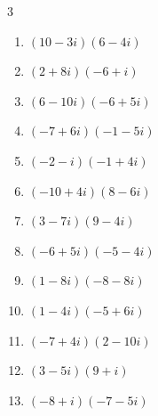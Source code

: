 \begin{multicols}{3}
\begin{enumerate}
        \phantom{$\displaystyle =-2+6i$}

  \item $\displaystyle (10-3i)(6-4i)$

        \phantom{$\displaystyle =48-58i$}

  \item $\displaystyle (2+8i)(-6+i)$

        \phantom{$\displaystyle =-20-46i$}

  \item $\displaystyle (6-10i)(-6+5i)$

        \phantom{$\displaystyle =14+90i$}

  \item $\displaystyle (-7+6i)(-1-5i)$

        \phantom{$\displaystyle =37+29i$}

  \item $\displaystyle (-2-i)(-1+4i)$

        \phantom{$\displaystyle =6-7i$}

  \item $\displaystyle (-10+4i)(8-6i)$

        \phantom{$\displaystyle =-56+92i$}

  \item $\displaystyle (3-7i)(9-4i)$

        \phantom{$\displaystyle =-1-75i$}

  \item $\displaystyle (-6+5i)(-5-4i)$

        \phantom{$\displaystyle =50-i$}

  \item $\displaystyle (1-8i)(-8-8i)$

        \phantom{$\displaystyle =-72+56i$}

  \item $\displaystyle (1-4i)(-5+6i)$

        \phantom{$\displaystyle =19+26i$}

  \item $\displaystyle (-7+4i)(2-10i)$

        \phantom{$\displaystyle =26+78i$}

  \item $\displaystyle (3-5i)(9+i)$

        \phantom{$\displaystyle =32-42i$}

  \item $\displaystyle (-8+i)(-7-5i)$


\end{enumerate}
\end{multicols}
